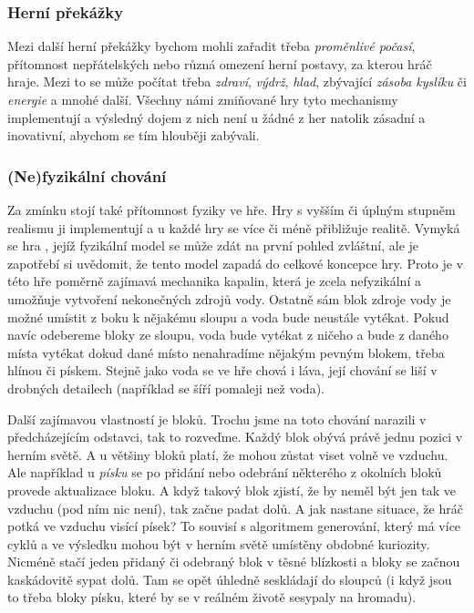 \subsubsection{Herní překážky}

Mezi další herní překážky bychom mohli zařadit třeba \textit{proměnlivé počasí}, přítomnost nepřátelských \NPC{} nebo různá omezení herní postavy, za kterou hráč hraje. Mezi to se může počítat třeba \textit{zdraví}, \textit{výdrž}, \textit{hlad}, zbývající \textit{zásoba kyslíku} či \textit{energie} a mnohé další. Všechny námi zmiňované hry tyto mechanismy implementují a výsledný dojem z nich není u žádné z her natolik zásadní a inovativní, abychom se tím hlouběji zabývali.

\subsubsection{(Ne)fyzikální chování}

Za zmínku stojí také přítomnost fyziky ve hře. Hry s vyšším či úplným stupněm realismu ji implementují a u každé hry se více či méně přibližuje realitě. Vymyká se hra \MC{}, jejíž fyzikální model se může zdát na první pohled zvláštní, ale je zapotřebí si uvědomit, že tento model zapadá do celkové koncepce hry. Proto je v této hře poměrně zajímavá mechanika kapalin, která je zcela nefyzikální a umožňuje vytvoření nekonečných zdrojů vody. Ostatně sám blok zdroje vody je možné umístit z boku k nějakému sloupu a voda bude neustále vytékat. Pokud navíc odebereme bloky ze sloupu, voda bude vytékat z ničeho a bude z daného místa vytékat dokud dané místo nenahradíme nějakým pevným blokem, třeba hlínou či pískem. Stejně jako voda se ve hře chová i láva, její chování se liší v drobných detailech (například se šíří pomaleji než voda).

Další zajímavou vlastností je  bloků. Trochu jsme na toto chování narazili v předcházejícím odstavci, tak to rozveďme. Každý blok obývá právě jednu pozici v herním světě. A u většiny bloků platí, že mohou zůstat viset volně ve vzduchu. Ale například u \textit{písku} se po přidání nebo odebrání některého z okolních bloků provede aktualizace bloku. A když takový blok zjistí, že by neměl být jen tak ve vzduchu (pod ním nic není), tak začne padat dolů. A jak nastane situace, že hráč potká ve vzduchu visící písek? To souvisí s algoritmem generování, který má více cyklů a ve výsledku mohou být v herním světě umístěny obdobné kuriozity. Nicméně stačí jeden přidaný či odebraný blok v těsné blízkosti a bloky se začnou kaskádovitě sypat dolů. Tam se opět úhledně seskládají do sloupců (i když jsou to třeba bloky písku, které by se v reálném životě sesypaly na hromadu).


